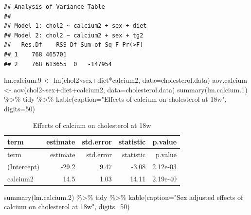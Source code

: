 \documentclass[
]{article}
\newenvironment{Shaded}{\begin{snugshade}}{\end{snugshade}}
\newcommand{\AttributeTok}[1]{\textcolor[rgb]{0.77,0.63,0.00}{#1}}
\newcommand{\DecValTok}[1]{\textcolor[rgb]{0.00,0.00,0.81}{#1}}
\newcommand{\FloatTok}[1]{\textcolor[rgb]{0.00,0.00,0.81}{#1}}
\newcommand{\FunctionTok}[1]{\textcolor[rgb]{0.00,0.00,0.00}{#1}}
\newcommand{\NormalTok}[1]{#1}
\newcommand{\OtherTok}[1]{\textcolor[rgb]{0.56,0.35,0.01}{#1}}
\newcommand{\SpecialCharTok}[1]{\textcolor[rgb]{0.00,0.00,0.00}{#1}}
\newcommand{\StringTok}[1]{\textcolor[rgb]{0.31,0.60,0.02}{#1}}
\begin{document}
\begin{verbatim}
## Analysis of Variance Table
## 
## Model 1: chol2 ~ calcium2 + sex + diet
## Model 2: chol2 ~ calcium2 + sex + tg2
##   Res.Df    RSS Df Sum of Sq F Pr(>F)
## 1    768 465701                      
## 2    768 613655  0   -147954
\end{verbatim}

\begin{Shaded}
\begin{Highlighting}[]
\NormalTok{lm.calcium}\FloatTok{.9} \OtherTok{\textless{}{-}} \FunctionTok{lm}\NormalTok{(chol2}\SpecialCharTok{\textasciitilde{}}\NormalTok{sex}\SpecialCharTok{+}\NormalTok{diet}\SpecialCharTok{*}\NormalTok{calcium2, }\AttributeTok{data=}\NormalTok{cholesterol.data)}
\NormalTok{aov.calcium }\OtherTok{\textless{}{-}} \FunctionTok{aov}\NormalTok{(chol2}\SpecialCharTok{\textasciitilde{}}\NormalTok{sex}\SpecialCharTok{+}\NormalTok{diet}\SpecialCharTok{+}\NormalTok{calcium2, }\AttributeTok{data=}\NormalTok{cholesterol.data)}
\FunctionTok{summary}\NormalTok{(lm.calcium}\FloatTok{.1}\NormalTok{) }\SpecialCharTok{\%\textgreater{}\%}\NormalTok{ tidy }\SpecialCharTok{\%\textgreater{}\%} \FunctionTok{kable}\NormalTok{(}\AttributeTok{caption=}\StringTok{"Effects of calcium on cholesterol at 18w"}\NormalTok{, }\AttributeTok{digits=}\DecValTok{50}\NormalTok{)}
\end{Highlighting}
\end{Shaded}

\begin{longtable}[]{@{}lrrrr@{}}
\caption{Effects of calcium on cholesterol at 18w}\tabularnewline
\toprule()
term & estimate & std.error & statistic & p.value \\
\midrule()
\endfirsthead
\toprule()
term & estimate & std.error & statistic & p.value \\
\midrule()
\endhead
(Intercept) & -29.2 & 9.47 & -3.08 & 2.12e-03 \\
calcium2 & 14.5 & 1.03 & 14.11 & 2.19e-40 \\
\bottomrule()
\end{longtable}

\begin{Shaded}
\begin{Highlighting}[]
\FunctionTok{summary}\NormalTok{(lm.calcium}\FloatTok{.2}\NormalTok{) }\SpecialCharTok{\%\textgreater{}\%}\NormalTok{ tidy }\SpecialCharTok{\%\textgreater{}\%} \FunctionTok{kable}\NormalTok{(}\AttributeTok{caption=}\StringTok{"Sex adjusted effects of calcium on cholesterol at 18w"}\NormalTok{, }\AttributeTok{digits=}\DecValTok{50}\NormalTok{)}
\end{Highlighting}
\end{Shaded}
\end{document}
